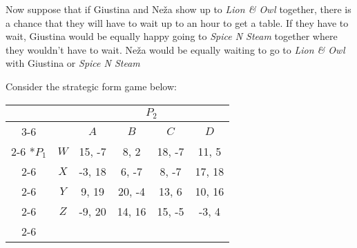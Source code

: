 \documentclass[addpoints]{exam}
\newcounter{BoSparts}
\begin{document}
\begin{questions}
\begin{parts}
  \setcounter{BoSparts}{\value{partno}}
  
\end{parts}

\newpage

Now suppose that if Giustina and Ne\v{z}a show up to \textit{Lion \& Owl} together,
there is a chance that they will have to wait up to an hour to get a table.
If they have to wait, Giustina would be equally happy going to \textit{Spice N Steam} 
together where they wouldn't have to wait. 
Ne\v{z}a would be equally waiting to go to \textit{Lion \& Owl} with Giustina
or \textit{Spice N Steam}
  

\newpage

\question%

Consider the strategic form game below:

\begin{table}[!h]
  \begin{center}
    \begin{tabular}{*{6}{c|}}
      \multicolumn{2}{c}{} & \multicolumn{4}{c}{$P_2$} \\ \cline{3-6}
      \multicolumn{1}{c}{} &  & $A$ & $B$ & $C$ & $D$ \\ \cline{2-6} 
      \multirow{4}*{$P_1$}
      & $W$ & 15, -7 &  8,  2 & 18, -7 & 11,  5 \\ \cline{2-6}
      & $X$ & -3, 18 &  6, -7 &  8, -7 & 17, 18 \\ \cline{2-6} 
      & $Y$ &  9, 19 & 20, -4 & 13,  6 & 10, 16 \\ \cline{2-6} 
      & $Z$ & -9, 20 & 14, 16 & 15, -5 & -3,  4 \\ \cline{2-6} 
  \end{tabular}
  \end{center}
\end{table}


\end{questions}
\end{document}
